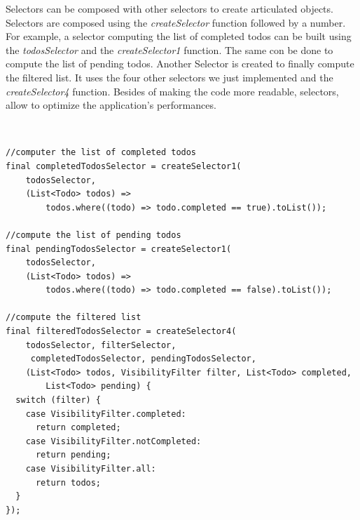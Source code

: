 Selectors can be composed with other selectors to create articulated objects. Selectors are composed using the \textit{createSelector} function followed by a number. For example, a selector computing the list of completed todos can be built using the \textit{todosSelector }and the \textit{createSelector1} function. The same con be done to compute the list of pending todos. Another Selector is created to finally compute the filtered list. It uses the four other selectors we just implemented and the \textit{createSelector4 }function. Besides of making the code more readable,  selectors, allow to optimize the application's performances.
\begin{code}
\mbox{}\\
 \mbox{}
		\label{code:2.64}
\begin{verbatim}
//computer the list of completed todos
final completedTodosSelector = createSelector1(
    todosSelector,
    (List<Todo> todos) =>
        todos.where((todo) => todo.completed == true).toList());

//compute the list of pending todos
final pendingTodosSelector = createSelector1(
    todosSelector,
    (List<Todo> todos) =>
        todos.where((todo) => todo.completed == false).toList());

//compute the filtered list
final filteredTodosSelector = createSelector4(
    todosSelector, filterSelector,
     completedTodosSelector, pendingTodosSelector,
    (List<Todo> todos, VisibilityFilter filter, List<Todo> completed,
        List<Todo> pending) {
  switch (filter) {
    case VisibilityFilter.completed:
      return completed;
    case VisibilityFilter.notCompleted:
      return pending;
    case VisibilityFilter.all:
      return todos;
  }
});
\end{verbatim}
\mbox{}
\end{code}

